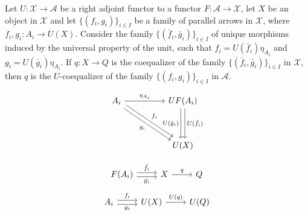 \begin{mainbox}{}
    \begin{lemma}\label{U-coeq}
        Let $U:\mathcal{X} \to \mathcal{A}$ be a right adjoint functor to a functor $F:\mathcal{A} \to \mathcal{X}$, let $X$ be an object in $\mathcal{X}$ and let $\{(f_i,g_i)\}_{i\in I}$ be a family of parallel arrows in $\mathcal{X}$, where $f_i,g_i: A_i \to U(X)$. Consider the family $\{(\bar{f}_i,\bar{g}_i)\}_{i\in I}$ of unique morphisms induced by the universal property of the unit, such that $f_i=U(\bar{f}_i)\eta_{A_i}$ and $g_i=U(\bar{g}_i)\eta_{A_i}$. If $q:X \to Q$ is the coequalizer of the family $\{(\bar{f}_i,\bar{g}_i)\}_{i\in I}$ in $\mathcal{X}$, then $q$ is the $U$-coequalizer of the family $\{(f_i,g_i)\}_{i\in I}$ in $\mathcal{A}$.
       
        \begin{minipage}{0.5\textwidth}
\[
\begin{tikzcd}
A_i \arrow[rr, "\eta_{A_i}"] \arrow[rrdd, "f_i", shift left] \arrow[rrdd, "g_i"', shift right] &  & UF(A_i) \arrow[dd, "U(\bar{f}_i)", shift left] \arrow[dd, "U(\bar{g}_i)"', shift right] \\
                                                                                               &  &                                                                                         \\
                                                                                               &  & U(X)                                                                                   
\end{tikzcd}
\]
        \end{minipage}
        \begin{minipage}{0.5\textwidth}
\[
\begin{tikzcd}
F(A_i) \arrow[r, "\bar{f}_i", shift left] \arrow[r, "\bar{g_i}"', shift right] & X \arrow[r, "q"] & Q
\end{tikzcd}
\]
\[
\begin{tikzcd}
A_i \arrow[r, "f_i", shift left] \arrow[r, "g_i"', shift right] & U(X) \arrow[r, "U(q)"] & U(Q)
\end{tikzcd}
\]
        \end{minipage}
    \end{lemma}
\end{mainbox}

